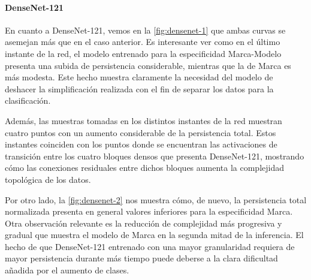 \paragraph{DenseNet-121}

En cuanto a DenseNet-121, vemos en la \autoref{fig:densenet-1} que ambas curvas se asemejan más que en el caso anterior. Es interesante ver como en el último instante de la red, el modelo entrenado para la especificidad Marca-Modelo presenta una subida de persistencia considerable, mientras que la de Marca es más modesta. Este hecho muestra claramente la necesidad del modelo de deshacer la simplificación realizada con el fin de separar los datos para la clasificación.

Además, las muestras tomadas en los distintos instantes de la red muestran cuatro puntos con un aumento considerable de la persistencia total. Estos instantes coinciden con los puntos donde se encuentran las activaciones de transición entre los cuatro bloques densos que presenta DenseNet-121, mostrando cómo las conexiones residuales entre dichos bloques aumenta la complejidad topológica de los datos.

Por otro lado, la \autoref{fig:densenet-2} nos muestra cómo, de nuevo, la persistencia total normalizada presenta en general valores inferiores para la especificidad Marca. Otra observación relevante es la reducción de complejidad más progresiva y gradual que muestra el modelo de Marca en la segunda mitad de la inferencia. El hecho de que DenseNet-121 entrenado con una mayor granularidad requiera de mayor persistencia durante más tiempo puede deberse a la clara dificultad añadida por el aumento de clases.

